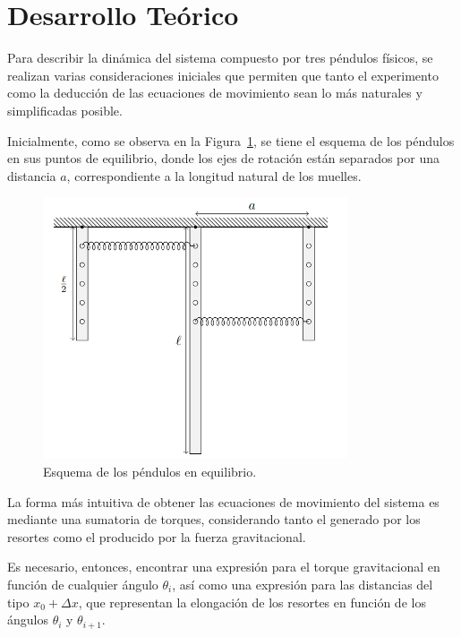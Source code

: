 \section{Desarrollo Teórico}

Para describir la dinámica del sistema compuesto por tres péndulos físicos, se realizan varias consideraciones iniciales que permiten que tanto el experimento como la deducción de las ecuaciones de movimiento sean lo más naturales y simplificadas posible.

Inicialmente, como se observa en la Figura~\ref{fig:esquema_equilibrio}, se tiene el esquema de los péndulos en sus puntos de equilibrio, donde los ejes de rotación están separados por una distancia \( a \), correspondiente a la longitud natural de los muelles.

\begin{figure}[h]
    \centering
    \includegraphics[width=0.8\textwidth]{Figures/Screenshot From 2025-05-25 23-48-28.png}
    \caption{Esquema de los péndulos en equilibrio.}
    \label{fig:esquema_equilibrio}
\end{figure}

La forma más intuitiva de obtener las ecuaciones de movimiento del sistema es mediante una sumatoria de torques, considerando tanto el generado por los resortes como el producido por la fuerza gravitacional.

Es necesario, entonces, encontrar una expresión para el torque gravitacional en función de cualquier ángulo \(\theta_i\), así como una expresión para las distancias del tipo \(x_0 + \Delta x\), que representan la elongación de los resortes en función de los ángulos \(\theta_i\) y \(\theta_{i+1}\).

